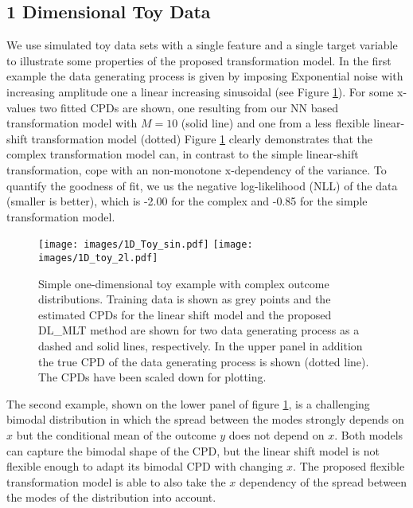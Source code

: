 \documentclass[a4paper,conference]{IEEEtran}
\begin{document}
\subsection{1 Dimensional Toy Data}
We use simulated toy data sets with a single feature and a single target variable to illustrate some properties of the proposed transformation model. In the first example the data generating process is given by imposing Exponential noise with increasing amplitude one a linear increasing sinusoidal (see Figure \ref{fig:fig_sin}). For some x-values two fitted CPDs are shown, one resulting from our NN based transformation model with $M=10$ (solid line) and one from a less flexible linear-shift transformation model (dotted) Figure \ref{fig:fig_sin} clearly demonstrates that the complex transformation model  can, in contrast to the simple linear-shift transformation, cope with an non-monotone x-dependency of the variance. To quantify the goodness of fit, we us the negative log-likelihood (NLL) of the data (smaller is better), which is -2.00 for the complex and -0.85 for the simple transformation model. 


\begin{figure}
\centering
\texttt{[image: images/1D\_Toy\_sin.pdf]}
\texttt{[image: images/1D\_toy\_2l.pdf]}
\caption{Simple one-dimensional toy example with complex outcome distributions. Training data is shown as grey points and the estimated CPDs for the linear shift model and the proposed DL\_MLT method are shown for two data generating process as a dashed and solid lines, respectively. In the upper panel in addition the true CPD of the data generating process is shown (dotted line). The CPDs have been scaled down for plotting.
}
\label{fig:fig_sin}
\end{figure}

The second example, shown on the lower panel of figure \ref{fig:fig_sin}, is a challenging bimodal distribution in which the spread between the modes strongly depends on $x$ but the conditional mean of the outcome $y$ does not depend on $x$. Both models can capture the bimodal shape of the CPD, but the linear shift model is not flexible enough to adapt its bimodal CPD with changing $x$. The proposed flexible transformation model is able to also take the $x$ dependency of the spread between the modes of the distribution into account. 
\end{document}
